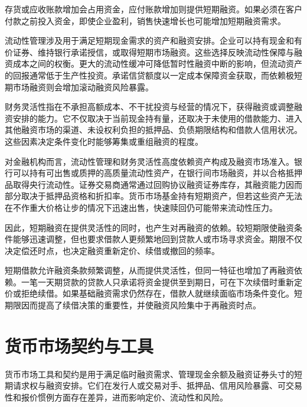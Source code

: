 存货或应收账款增加会占用资金，应付账款增加则提供短期融资。如果必须在客户付款之前投入资金，即使企业盈利，销售快速增长也可能增加短期融资需求。

流动性管理涉及用于满足短期现金需求的资产和融资安排。企业可以持有现金和有价证券、维持银行承诺授信，或取得短期市场融资。这些选择反映流动性保障与融资成本之间的权衡。更大的流动性缓冲可降低暂时性融资中断的影响，但流动资产的回报通常低于生产性投资。承诺信贷额度以一定成本保障资金获取，而依赖极短期市场融资则会增加滚动融资风险暴露。

财务灵活性指在不承担高额成本、不干扰投资与经营的情况下，获得融资或调整融资安排的能力。它不仅取决于当前现金持有量，还取决于未使用的借款能力、进入其他融资市场的渠道、未设权利负担的抵押品、负债期限结构和借款人信用状况。这些因素决定条件变化时能够筹集或重组融资的程度。

对金融机构而言，流动性管理和财务灵活性高度依赖资产构成及融资市场准入。银行可以持有可出售或质押的高质量流动性资产，在银行间市场融资，并以合格抵押品取得央行流动性。证券交易商通常通过回购协议融资证券库存，其融资能力因而部分取决于抵押品资格和折扣率。货币市场基金持有短期资产，但若这些资产无法在不作重大价格让步的情况下迅速出售，快速赎回仍可能带来流动性压力。

因此，短期融资在提供灵活性的同时，也产生对再融资的依赖。较短期限使融资条件能够迅速调整，但也要求借款人更频繁地回到贷款人或市场寻求资金。期限不仅决定偿还时点，也决定融资重新定价、续借或撤回的频率。

\begin{tcolorbox}[
    enhanced,
    breakable,
    colback=white,
    colframe=FinanceBlue,
    boxrule=0.7pt,
    sharp corners,
    borderline west={2.2pt}{0pt}{FinanceBlue},
    title=\textbf{金融视角：短期限与滚动融资依赖},
    coltitle=white,
    colbacktitle=FinanceBlue,
    fonttitle=\bfseries,
    before skip=1.2em,
    after skip=1.2em
]

短期借款允许融资条款频繁调整，从而提供灵活性，但同一特征也增加了再融资依赖。一笔一天期贷款的贷款人只承诺将资金提供至到期日，可在下次续借时重新定价或拒绝续借。如果基础融资需求仍然存在，借款人就继续面临市场条件变化。短期限因而提高了续借决策的重要性，并使融资风险集中于再融资时点。

\end{tcolorbox}

\section{货币市场契约与工具}

货币市场工具和契约是用于满足临时融资需求、管理现金余额及融资证券头寸的短期请求权与融资安排。它们在发行人或交易对手、抵押品、信用风险暴露、可交易性和报价惯例方面存在差异，进而影响定价、流动性和风险。

